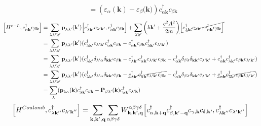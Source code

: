 \documentclass[12pt,english,a4paper]{article}
\newcommand{\dg}{\dagger}
\begin{document}
\begin{appendices}
\begin{align}
	&= (\varepsilon_\alpha(\textbf{k}) - \varepsilon_{\beta}\textbf{(k)})c^\dg_{\alpha\textbf{k}} c_{\beta\textbf{k}}
\end{align}
\begin{align}
	\comm{H^{e-L}}{c^\dg_{\alpha \textbf{k}} c_{\beta \textbf{k}}} &= \sum_{\lambda\lambda' \textbf{k}'}\textbf{p}_{\lambda\lambda'}(\textbf{k}')\comm{c^\dg_{\lambda\textbf{k}'}c_{\lambda'\textbf{k}'}}{c_{\alpha \textbf{k}}^\dg c_{\beta \textbf{k}}} + \sum_{\lambda\textbf{k}'} \bigg(\hbar\textbf{k}'+\frac{e^2 A^2}{2m}\bigg) \cancel{\comm{c^\dg_{\lambda\textbf{k}'}c_{\lambda \textbf{k}'}}{c_{\alpha\textbf{k}}^\dg c_{\beta \textbf{k}}}}\nonumber \\
	&=\sum_{\lambda\lambda' \textbf{k}'}\textbf{p}_{\lambda\lambda'}(\textbf{k}')(c^\dg_{\lambda\textbf{k}'}c_{\lambda'\textbf{k}'}c_{\alpha \textbf{k}}^\dg c_{\beta \textbf{k}} - c_{\alpha \textbf{k}}^\dg c_{\beta \textbf{k}}c^\dg_{\lambda\textbf{k}'}c_{\lambda'\textbf{k}'})\nonumber  \nonumber\\
	&=\sum_{\lambda\lambda' \textbf{k}'}\textbf{p}_{\lambda\lambda'}(\textbf{k}')(c^\dg_{\lambda\textbf{k}'}\delta_{\lambda'\alpha} \delta_{\textbf{k}\textbf{k}'}c_{\beta \textbf{k}} -c^\dg_{\lambda\textbf{k}'}c_{\alpha \textbf{k}}^\dg c_{\lambda'\textbf{k}'}c_{\beta \textbf{k}}
	- c_{\alpha \textbf{k}}^\dg \delta_{\beta \lambda}\delta_{\textbf{k}\textbf{k}'} c_{\lambda'\textbf{k}'}
	+ c_{\alpha \textbf{k}}^\dg c^\dg_{\lambda\textbf{k}'} c_{\beta \textbf{k}}c_{\lambda'\textbf{k}'}
	)\nonumber\\
	&= \sum_{\lambda\lambda' \textbf{k}'}\textbf{p}_{\lambda\lambda'}(\textbf{k}')(c^\dg_{\lambda\textbf{k}'}\delta_{\lambda'\alpha} \delta_{\textbf{k}\textbf{k}'}c_{\beta \textbf{k}} -\cancel{c^\dg_{\lambda\textbf{k}'}c_{\alpha \textbf{k}}^\dg c_{\lambda'\textbf{k}'}c_{\beta \textbf{k}}}
	- c_{\alpha \textbf{k}}^\dg \delta_{\beta \lambda}\delta_{\textbf{k}\textbf{k}'} c_{\lambda'\textbf{k}'}
	+ \cancel{c_{\alpha \textbf{k}}^\dg c^\dg_{\lambda\textbf{k}'} c_{\beta \textbf{k}}c_{\lambda'\textbf{k}'}}
	)\nonumber\\ \label{Interaction commu}
	&= \sum_{\lambda}(\textbf{p}_{\lambda \alpha}(\textbf{k}) c^\dg_{\lambda \textbf{k}} c_{\beta \textbf{k}} - \textbf{P}_{\beta\lambda'}(\textbf{k}) c^\dg_{\alpha\textbf{k}}c_{\lambda'\textbf{k}})
\end{align}
\begin{align}
	\comm{H^{Coulomb}}{c^\dg_{\lambda \textbf{k}''} c_{\lambda' \textbf{k}''}} &= \sum_{\textbf{k}, \textbf{k}', \textbf{q}} \sum_{\alpha \beta \gamma \delta} W^{\alpha \beta \gamma \delta}_{\textbf{k},\textbf{k'},\textbf{q}}\comm{ c_{\alpha, \textbf{k}+\textbf{q}}^\dg c_{\beta, \textbf{k}' - \textbf{q}}^\dg c_{\gamma, \textbf{k}}c_{\delta, \textbf{k'}}}{c^\dg_{\lambda \textbf{k}''} c_{\lambda' \textbf{k}''}} \nonumber\\

\end{align}
\end{appendices}
\end{document}
